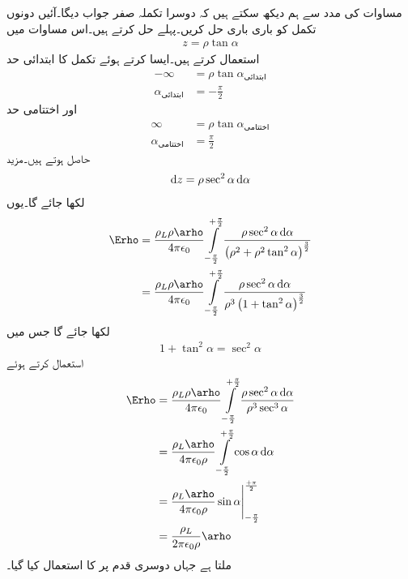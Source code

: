 مساوات  کی مدد سے ہم دیکھ سکتے ہیں کہ دوسرا تکملہ صفر جواب دیگا۔آئیں دونوں تکمل کو باری باری حل کریں۔پہلے \Erho حل کرتے ہیں۔اس مساوات میں
\begin{align*}
z=\rho \tan \alpha
\end{align*}
استعمال کرتے ہیں۔ایسا کرتے ہوئے تکمل کا ابتدائی حد 
\begin{align*}
-\infty &= \rho \tan \alpha_{\text{ابتدائی}}\\
\alpha_{\text{ابتدائی}} &= -\frac{\pi}{2}
\end{align*}
اور اختتامی حد
\begin{align*}
\infty &= \rho \tan \alpha_{\text{اختتامی}}\\
\alpha_{\text{اختتامی}} &= \frac{\pi}{2}
\end{align*}
حاصل ہوتے ہیں۔مزید
\begin{align*}
\dif z=\rho \sec^2 \alpha \dif \alpha
\end{align*}
لکھا جائے گا۔یوں
\begin{align*}
\Erho&=\frac{\rho_L \rho \arho}{4 \pi \epsilon_0}\int\limits_{-\frac{\pi}{2}}^{+\frac{\pi}{2}} \frac{\rho \sec^2 \alpha \dif \alpha}{\left(\rho^2+\rho^2 \tan^2 \alpha \right)^{\frac{3}{2}}}\\
&=\frac{\rho_L \rho \arho}{4 \pi \epsilon_0}\int\limits_{-\frac{\pi}{2}}^{+\frac{\pi}{2}} \frac{\rho \sec^2 \alpha \dif \alpha}{\rho^3 \left(1+ \tan^2 \alpha \right)^{\frac{3}{2}}}
\end{align*}
لکھا جائے گا جس میں
\begin{align*}
1+\tan^2 \alpha=\sec^2 \alpha
\end{align*}
استعمال کرتے ہوئے
\begin{gather}
\begin{aligned}\label{مساوات_کولمب_لامحدود_لکیر_رداسی_میدان}
\Erho&=\frac{\rho_L \rho \arho}{4 \pi \epsilon_0}\int\limits_{-\frac{\pi}{2}}^{+\frac{\pi}{2}} \frac{\rho \sec^2 \alpha \dif \alpha}{\rho^3 \sec^3 \alpha}\\
&=\frac{\rho_L  \arho}{4 \pi \epsilon_0 \rho}\int\limits_{-\frac{\pi}{2}}^{+\frac{\pi}{2}} \cos \alpha \dif \alpha\\
&=\frac{\rho_L  \arho}{4 \pi \epsilon_0 \rho} \eval{\sin \alpha}_{-\frac{\pi}{2}}^{\frac{+\pi}{2}}\\
&=\frac{\rho_L }{2 \pi \epsilon_0 \rho} \arho
\end{aligned}
\end{gather}
ملتا ہے جہاں دوسری  قدم پر  کا استعمال کیا گیا۔

